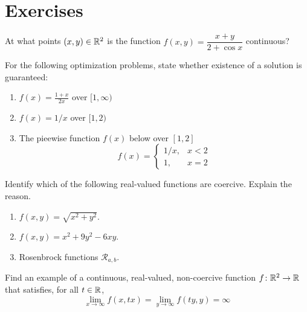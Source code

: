 
\section*{Exercises}
\begin{problem}
At what points $(x,y) \in \mathbb{R}^2$ is the function $f(x,y) = \dfrac{x+y}{2+\cos x}$ continuous?
\end{problem}

\begin{problem}
For the following optimization problems, state whether existence of a solution is guaranteed:
\begin{enumerate}
	\item $f(x) = \frac{1+x}{2x}$ over $[1,\infty)$
	\item $f(x) = 1/x$ over $[1,2)$
	\item The pieewise function $f(x)$ below over $[1,2]$
	\begin{equation*}
	f(x) = \begin{cases}
	1/x, &x<2 \\
	1,   &x=2
	\end{cases}
	\end{equation*}
\end{enumerate}
\end{problem}

\begin{problem}
Identify which of the following real-valued functions are coercive.  Explain the reason.
\begin{enumerate}
	\item $f(x,y) = \sqrt{x^2+y^2}$.
	\item $f(x,y) = x^2 + 9y^2 - 6xy$.
	\item Rosenbrock functions $\mathcal{R}_{a,b}$.
\end{enumerate}
\end{problem}

\begin{problem}
Find an example of a continuous, real-valued, non-coercive function $f\colon \mathbb{R}^2 \to \mathbb{R}$ that satisfies, for all $t \in \mathbb{R}$,
\begin{equation*}
\lim_{x \to \infty} f(x, tx) = \lim_{y \to \infty} f(ty, y) = \infty
\end{equation*}
\end{problem}

